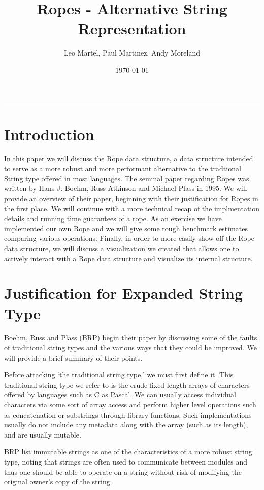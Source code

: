 \documentclass[12pt]{article}
\title{Ropes - Alternative String Representation}
\author{Leo Martel, Paul Martinez, Andy Moreland}
\date{\today}
\begin{document}
\maketitle
\vspace{-0.3in}
\rule{\linewidth}{0.4pt}


\section{Introduction}

In this paper we will discuss the Rope data structure, a data structure intended to serve as a more robust and more performant alternative to the tradtional String type offered in most languages.
The seminal paper regarding Ropes was written by Hans-J. Boehm, Russ Atkinson and Michael Plass in 1995.
We will provide an overview of their paper, beginning with their justification for Ropes in the first place.
We will continue with a more technical recap of the implmentation details and running time guarantees of a rope.
As an exercise we have implemented our own Rope and we will give some rough benchmark estimates comparing various operations.
Finally, in order to more easily show off the Rope data structure, we will discuss a visualization we created that allows one to actively interact with a Rope data structure and visualize its internal structure.

\section{Justification for Expanded String Type}

Boehm, Russ and Plass (BRP) begin their paper by discussing some of the faults of traditional string types and the various ways that they could be improved.
We will provide a brief summary of their points.

Before attacking `the traditional string type,' we must first define it.
This traditional string type we refer to is the crude fixed length arrays of characters offered
by languages such as C as Pascal.
We can usually access individual characters via some sort of array access and perform higher level operations such as concatenation or substrings through library functions.
Such implementations usually do not include any metadata along with the array (such as its length), and are usually mutable.

BRP list immutable strings as one of the characteristics of a more robust string type, noting that strings are often used to communicate between modules and thus one should be able to operate on a string without risk of modifying the original owner's copy of the string.
\end{document}
